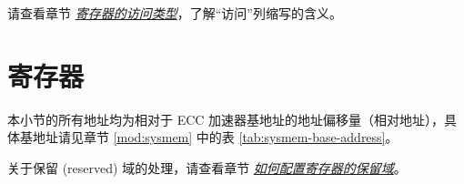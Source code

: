 \documentclass[main\_\_CN.tex]{subfiles}
\begin{document}
请查看章节 \hyperref[glossary-access-types]{\textit{寄存器的访问类型}}，了解“访问”列缩写的含义。






\newpage
\section{寄存器}

本小节的所有地址均为相对于 ECC 加速器基地址的地址偏移量（相对地址），具体基地址请见章节 \ref{mod:sysmem} \textit{} 中的表 \ref{tab:sysmem-base-address}。

关于保留 (reserved) 域的处理，请查看章节 \hyperref[programming-reserved-field]{\textit{如何配置寄存器的保留域}}。


\end{document}
